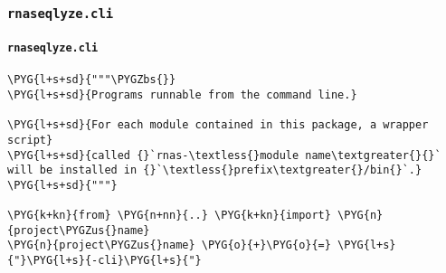 
\subsubsection{\texttt{rnaseqlyze.cli}}
\label{index-pdf4:rnaseqlyze-cli}\label{index-pdf4::doc}

\paragraph{\texttt{rnaseqlyze.cli}}
\label{index-pdf4:id1}
\begin{Verbatim}[commandchars=\\\{\}]
\PYG{l+s+sd}{"""\PYGZbs{}}
\PYG{l+s+sd}{Programs runnable from the command line.}

\PYG{l+s+sd}{For each module contained in this package, a wrapper script}
\PYG{l+s+sd}{called {}`rnas-\textless{}module name\textgreater{}{}` will be installed in {}`\textless{}prefix\textgreater{}/bin{}`.}
\PYG{l+s+sd}{"""}

\PYG{k+kn}{from} \PYG{n+nn}{..} \PYG{k+kn}{import} \PYG{n}{project\PYGZus{}name}
\PYG{n}{project\PYGZus{}name} \PYG{o}{+}\PYG{o}{=} \PYG{l+s}{"}\PYG{l+s}{-cli}\PYG{l+s}{"}
\end{Verbatim}


